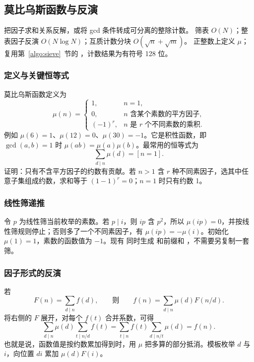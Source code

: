 \subsection{莫比乌斯函数与反演}
\label{algo:mobius}
\AlgorithmInfo
    {把因子求和关系反解，或将 gcd 条件转成可分离的整除计数。}
    {筛表 $O(N)$；整表因子反演 $O(N\log N)$；互质计数分块 $O(\sqrt n+\sqrt m)$。}
    {正整数上定义 $\mu$；复用第~\ref{algo:sieve}~节的 ，计数结果为有符号 128 位。}

\subsubsection*{定义与关键恒等式}
莫比乌斯函数定义为
\[
    \mu(n)=\begin{cases}
        1,&n=1,\\
        0,&n\text{ 含某个素数的平方因子},\\
        (-1)^r,&n\text{ 是 }r\text{ 个不同素数的乘积}.
    \end{cases}
\]
例如 $\mu(6)=1$、$\mu(12)=0$、$\mu(30)=-1$。它是积性函数，即 $\gcd(a,b)=1$ 时 $\mu(ab)=\mu(a)\mu(b)$。最常用的恒等式为
\[
    \sum_{d\mid n}\mu(d)=[n=1].
\]
证明：只有不含平方因子的约数有贡献。若 $n>1$ 含 $r$ 种不同素因子，选其中任意子集组成约数，求和等于 $(1-1)^r=0$；$n=1$ 时只有约数 1。

\subsubsection*{线性筛递推}
令 $p$ 为线性筛当前枚举的素数。若 $p\mid i$，则 $ip$ 含 $p^2$，所以 $\mu(ip)=0$，并按线性筛规则停止；否则多了一个不同素因子，有 $\mu(ip)=-\mu(i)$。初始化 $\mu(1)=1$，素数的函数值为 $-1$。现有  同时生成  和前缀和 ，不需要另复制一套筛。

\subsubsection*{因子形式的反演}
若
\[
    F(n)=\sum_{d\mid n}f(d),
    \qquad\text{则}\qquad
    f(n)=\sum_{d\mid n}\mu(d)F(n/d).
\]
将右侧的 $F$ 展开，对每个 $f(t)$ 合并系数，可得
\[
    \sum_{d\mid n}\mu(d)\sum_{t\mid n/d}f(t)
    =\sum_{t\mid n}f(t)\sum_{d\mid n/t}\mu(d)=f(n).
\]
也就是说，函数值是按约数累加得到时，用 $\mu$ 把多算的部分抵消。模板枚举 $d$ 与 $i$，向位置 $di$ 累加 $\mu(d)F(i)$。

